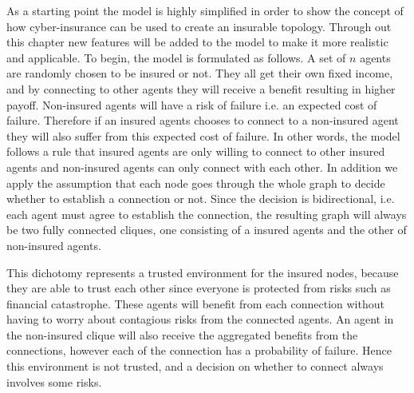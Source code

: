 As a starting point the model is highly simplified in order to show the concept of how cyber-insurance can be used to create an insurable topology. Through out this chapter new features will be added to the model to make it more realistic and applicable. To begin, the model is formulated as follows.
A set of $n$ agents are randomly chosen to be insured or not. They all get their own fixed income, and by connecting to other agents they will receive a benefit resulting in higher payoff. Non-insured agents will have a risk of failure i.e. an expected cost of failure. Therefore if an insured agents chooses to connect to a non-insured agent they will also suffer from this expected cost of failure. In other words, the model follows a rule that insured agents are only willing to connect to other insured agents and non-insured agents can only connect with each other. In addition we apply the assumption that each node goes through the whole graph to decide whether to establish a connection or not. Since the decision is bidirectional, i.e. each agent must agree to establish the connection, the resulting graph will always be two fully connected cliques, one consisting of a insured agents and the other of non-insured agents. 


This dichotomy represents a trusted environment for the insured nodes, because they are able to trust each other since everyone is protected from risks such as financial catastrophe. These agents will benefit from each connection without having to worry about contagious risks from the connected agents. 
An agent in the non-insured clique will also receive the aggregated benefits from the connections, however each of the connection has a probability of failure. Hence this environment is not trusted, and a decision on whether to connect always involves some risks. 


